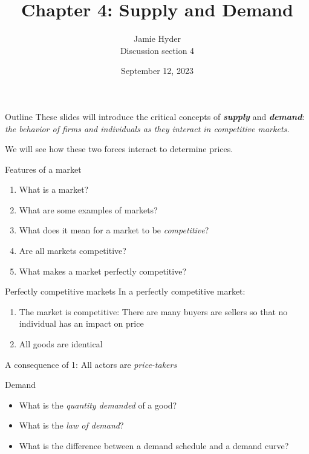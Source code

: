 \documentclass[compress]{beamer}
\title{Chapter 4: Supply and Demand}
\author{Jamie Hyder \\
    Discussion section 4}
\date{September 12, 2023}
\begin{document}
\begin{frame}
    \titlepage 
\end{frame}

\begin{frame}{Outline}
    These slides will introduce the critical concepts of \textbf{\textit{supply}} and \textbf{\textit{demand}}:\textit{ the behavior of firms and individuals as they interact in competitive markets.}
    
    \medskip
    \medskip

    We will see how these two forces interact to determine prices.
\end{frame}

\begin{frame}{Features of a market}
    \begin{enumerate}
        \item What is a market?
        \item What are some examples of markets?
        \item What does it mean for a market to be \textit{competitive}?
        \item Are all markets competitive?
        \item What makes a market perfectly competitive?
    \end{enumerate}
\end{frame}

\begin{frame}{Perfectly competitive markets}
    In a perfectly competitive market:
    \begin{enumerate}
        \item The market is competitive: There are many buyers are sellers so that no individual has an impact on price
        \item All goods are identical
    \end{enumerate}
    \medskip
    \begin{center}
    A consequence of 1: All actors are \textit{price-takers}
    \end{center}
\end{frame}

\begin{frame}{Demand} 
\begin{itemize}
    \item     What is the \textit{quantity demanded} of a good?
    \item     What is the \textit{law of demand}?
    \item     What is the difference between a demand schedule and a demand curve?
\end{itemize}
\end{frame} 
\end{document}
